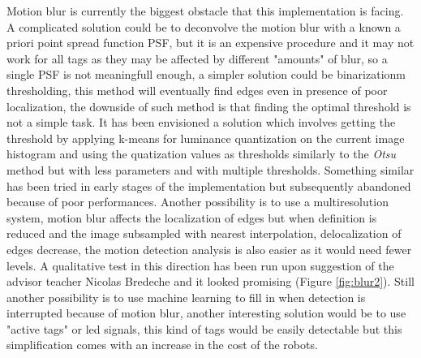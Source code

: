 \documentclass[a4paper]{report}
\begin{document}
Motion blur is currently the biggest obstacle that this implementation is facing. A complicated solution could be to deconvolve the motion blur with a known a priori point spread function PSF, but it is an expensive procedure and it may not work for all tags as they may be affected by different "amounts" of blur, so a single PSF is not meaningfull enough, a simpler solution could be binarizationm thresholding, this method will eventually find edges even in presence of poor localization, the downside of such method is that finding the optimal threshold is not a simple task. It has been envisioned a solution which involves getting the threshold by applying k-means for luminance quantization on the current image histogram and using the quatization values as thresholds similarly to the \textit{Otsu} method but with less parameters and with multiple thresholds. Something similar has been tried in early stages of the implementation but subsequently abandoned because of poor performances. Another possibility is to use a multiresolution system, motion blur affects the localization of edges but when definition is reduced and the image subsampled with nearest interpolation, delocalization of edges decrease, the motion detection analysis is also easier as it would need fewer levels. A qualitative test in this direction has been run upon suggestion of the advisor teacher Nicolas Bredeche and it looked promising (Figure \ref{fig:blur2}). Still another possibility is to use machine learning to fill in when detection is interrupted because of motion blur, another interesting solution would be to use "active tags" or led signals, this kind of tags would be easily detectable but this simplification comes with an increase in the cost of the robots.
\end{document}
